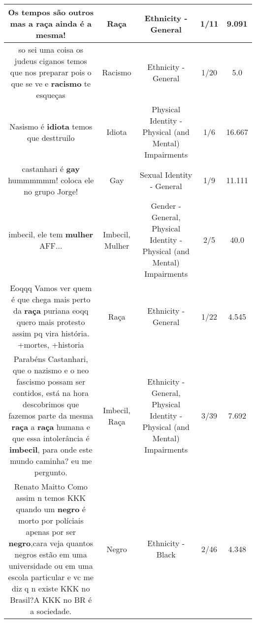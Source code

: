 \documentclass[11pt]{article}
\newlength\mylength
\begin{document}
\begin{center}
\begin{longtable}{|C{.65\mylength}|C{.30\mylength}|C{.12\mylength}|C{.12\mylength}|C{.12\mylength}|}
  \small Os tempos são outros mas a \textbf{raça} ainda é a mesma!\normalsize   & Raça & Ethnicity - General & 1/11 & 9.091 \\  \hline
  \small so sei uma coisa os judeus ciganos temos que nos preparar pois o que se
ve e \textbf{racismo} te esqueças\normalsize   & Racismo & Ethnicity - General & 1/20 & 5.0 \\  \hline
  \small Nasismo é \textbf{idiota} temos que desttruilo\normalsize   & Idiota & Physical Identity - Physical (and Mental) Impairments & 1/6 & 16.667 \\  \hline
  \small castanhari é \textbf{gay} hummmmmm! coloca ele no grupo Jorge!\normalsize   & Gay & Sexual Identity - General & 1/9 & 11.111 \\  \hline
  \small imbecil, ele tem \textbf{mulher} AFF...\normalsize   & Imbecil, Mulher & Gender - General, Physical Identity - Physical (and Mental) Impairments & 2/5 & 40.0 \\  \hline
  \small Eoqqq Vamos ver quem é  que chega mais perto da \textbf{raça} puriana eoqq quero mais protesto assim pq vira história. +mortes, +historia\normalsize   & Raça & Ethnicity - General & 1/22 & 4.545 \\  \hline
  \small Parabéns Castanhari, que o nazismo e o neo fascismo possam ser contidos, está na hora descobrimos que fazemos parte da mesma \textbf{raça} a \textbf{raça} humana e que essa intolerância é \textbf{imbecil}, para onde este mundo caminha? eu me pergunto.\normalsize   & Imbecil, Raça & Ethnicity - General, Physical Identity - Physical (and Mental) Impairments & 3/39 & 7.692 \\  \hline
  \small Renato Maitto Como assim n temos KKK quando um \textbf{negro} é morto por políciais apenas por ser \textbf{negro},cara veja quantos negros estão em uma universidade ou em uma escola particular e vc me diz q n existe KKK no Brasil?A KKK no BR é a sociedade.\normalsize   & Negro & Ethnicity - Black & 2/46 & 4.348 \\  \hline

\end{longtable}
\end{center}
\end{document}

